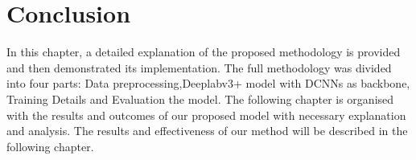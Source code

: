 \section{Conclusion}
In this chapter, a detailed explanation of the proposed methodology is provided and then demonstrated its implementation. The full methodology was divided into four parts: Data preprocessing,Deeplabv3+ model with DCNNs as backbone, Training Details and Evaluation the model. The following chapter is organised with the results and outcomes of our proposed model with necessary explanation and analysis. The results and effectiveness of our method will be described in the following chapter.